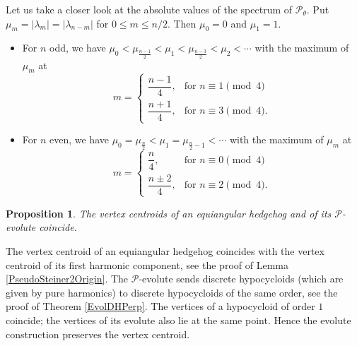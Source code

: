 \documentclass[12pt]{article}
\makeatletter
\newtheorem{proposition}[lemma]{Proposition}
\renewenvironment{proof}[1][\proofname] 
{\par\pushQED{\qed}\normalfont\topsep6\p@\@plus6\p@\relax\trivlist\item[\hskip\labelsep\bfseries#1\@addpunct{.}]\ignorespaces}{\popQED\endtrivlist\@endpefalse}
\newcommand{\Pev}{\mathcal{P}}
\makeatother
\begin{document}
Let us take a closer look at the absolute values of the spectrum of  $\Pev_\theta$. Put $\mu_m = |\lambda_m| = |\lambda_{n-m}|$ for $0 \le m \le n/2$. Then $\mu_0 = 0$ and $\mu_1 = 1$.
\begin{itemize}
\item For $n$ odd, we have $\mu_0 < \mu_{\frac{n-1}2} < \mu_1 < \mu_{\frac{n-3}2} < \mu_2 <\cdots$ with the maximum of $\mu_m$ at \[ m =
\begin{cases}
\dfrac{n-1}4, &\text{for } n \equiv 1 \pmod 4\\
\dfrac{n+1}4, &\text{for } n \equiv 3 \pmod 4.
\end{cases} \]
\item For $n$ even, we have $\mu_0 = \mu_{\frac{n}2} < \mu_1 = \mu_{\frac{n}2-1} < \cdots$ with the maximum of $\mu_m$ at \[ m =
\begin{cases}
\dfrac{n}4, &\text{for } n \equiv 0\pmod 4\\
\dfrac{n\pm 2}4, &\text{for } n \equiv 2 \pmod 4.
\end{cases} \]
\end{itemize}


\begin{proposition}
\label{PsStPres}
The vertex centroids of an equiangular hedgehog and of its $\Pev$-evolute coincide.
\end{proposition}
\begin{proof}
The vertex centroid of an equiangular hedgehog coincides with the vertex centroid of its first harmonic component, see the proof of Lemma \ref{PseudoSteiner2Origin}. The $\Pev$-evolute sends discrete hypocycloids (which are given by pure harmonics) to discrete hypocycloids of the same order, see the proof of Theorem \ref{EvolDHPerp}. The vertices of a hypocycloid of order $1$ coincide; the vertices of its evolute also lie at the same point. Hence the evolute construction preserves the vertex centroid.
\end{proof}
\end{document}
